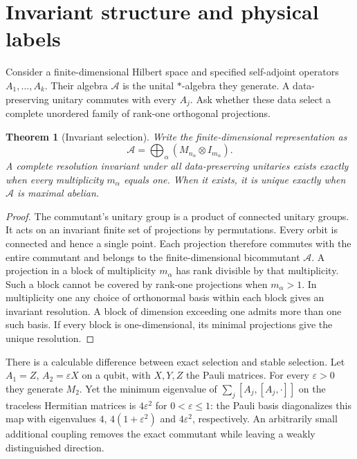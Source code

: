 \documentclass[11pt,letterpaper]{article}
\newtheorem{theorem}{Theorem}[section]\newtheorem{proposition}[theorem]{Proposition}\newtheorem{corollary}[theorem]{Corollary}
\begin{document}
\section{Invariant structure and physical labels}\label{sec:alg}

Consider a finite-dimensional Hilbert space and specified self-adjoint operators $A_1,\ldots,A_k$. Their algebra $\mathcal A$ is the unital $*$-algebra they generate. A data-preserving unitary commutes with every $A_j$. Ask whether these data select a complete unordered family of rank-one orthogonal projections.

\begin{theorem}[Invariant selection]
Write the finite-dimensional representation as
\[
 \mathcal A=\bigoplus_\alpha (M_{n_\alpha}\otimes I_{m_\alpha}).
\]
A complete resolution invariant under all data-preserving unitaries exists exactly when every multiplicity $m_\alpha$ equals one. When it exists, it is unique exactly when $\mathcal A$ is maximal abelian.
\end{theorem}
\begin{proof}
The commutant's unitary group is a product of connected unitary groups. It acts on an invariant finite set of projections by permutations. Every orbit is connected and hence a single point. Each projection therefore commutes with the entire commutant and belongs to the finite-dimensional bicommutant $\mathcal A$. A projection in a block of multiplicity $m_\alpha$ has rank divisible by that multiplicity. Such a block cannot be covered by rank-one projections when $m_\alpha>1$. In multiplicity one any choice of orthonormal basis within each block gives an invariant resolution. A block of dimension exceeding one admits more than one such basis. If every block is one-dimensional, its minimal projections give the unique resolution.
\end{proof}

There is a calculable difference between exact selection and stable selection. Let $A_1=Z$, $A_2=\varepsilon X$ on a qubit, with $X,Y,Z$ the Pauli matrices. For every $\varepsilon>0$ they generate $M_2$. Yet the minimum eigenvalue of $\sum_j[A_j,[A_j,\cdot]]$ on the traceless Hermitian matrices is $4\varepsilon^2$ for $0<\varepsilon\le1$: the Pauli basis diagonalizes this map with eigenvalues $4$, $4(1+\varepsilon^2)$ and $4\varepsilon^2$, respectively. An arbitrarily small additional coupling removes the exact commutant while leaving a weakly distinguished direction.
\end{document}
